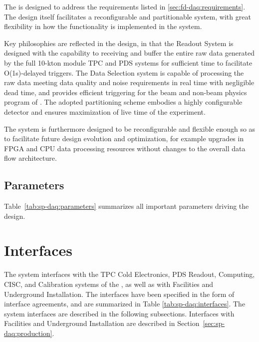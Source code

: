 The    is designed to address the requirements listed in
\ref{sec:fd-daq:requirements}. The design itself facilitates a
reconfigurable and partitionable  system, with great flexibility in how
the  functionality is implemented in the system. 

Key philosophies are reflected in the design, in that the Readout System is
designed with the capability to receiving and buffer the entire raw data generated by
the full 10-kton module TPC and PDS systems for sufficient time to
facilitate O(1s)-delayed triggers. The Data Selection system
is capable of processing the raw data meeting data quality and noise
requirements in real time with negligible dead time, and provides
efficient triggering for the beam and non-beam physics program of
. The adopted  partitioning scheme embodies a highly configurable detector and ensures
maximization of live time of the experiment. 

The system is furthermore designed to be reconfigurable and flexible
enough so as to facilitate future design evolution and optimization,
for example upgrades in FPGA and CPU data processing resources without changes to the
overall data flow architecture.

\subsection{Parameters}
\label{sec:sp-daq:parameters}

Table~\ref{tab:sp-daq:parameters} summarizes all important parameters
driving the  design.



\section{Interfaces}
\label{sec:sp-daq:interfaces}
The    system interfaces with the TPC Cold Electronics, PDS
Readout, Computing, CISC, and Calibration systems of the 
, as well as with Facilities and Underground Installation. The
interfaces have been specified in the form of interface agreements,
and are summarized in Table \ref{tab:sp-daq:interfaces}. The system
interfaces are described in the following subsections. Interfaces with
Facilities and Underground Installation are described in Section~\ref{sec:sp-daq:production}.

